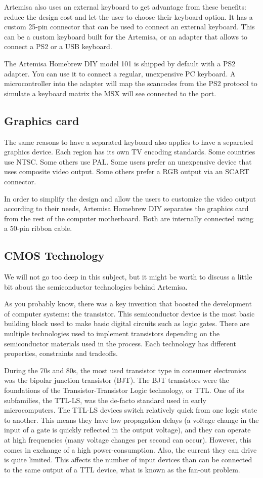 Artemisa also uses an external keyboard to get advantage from these benefits: reduce the design cost and let the user to choose their keyboard option. It has a custom 25-pin connector that can be used to connect an external keyboard. This can be a custom keyboard built for the Artemisa, or an adapter that allows to connect a PS2 or a USB keyboard.

The Artemisa Homebrew DIY model 101 is shipped by default with a PS2 adapter. You can use it to connect a regular, unexpensive PC keyboard. A microcontroller into the adapter will map the scancodes from the PS2 protocol to simulate a keyboard matrix the MSX will see connected to the port.

\subsection{Graphics card}

The same reasons to have a separated keyboard also applies to have a separated graphics device. Each region has its own TV encoding standards. Some countries use NTSC. Some others use PAL. Some users prefer an unexpensive device that uses composite video output. Some others prefer a RGB output via an SCART connector.

In order to simplify the design and allow the users to customize the video output according to their needs, Artemisa Homebrew DIY separates the graphics card from the rest of the computer motherboard. Both are internally connected using a 50-pin ribbon cable.

\subsection{CMOS Technology}

We will not go too deep in this subject, but it might be worth to discuss a little bit about the semiconductor technologies behind Artemisa.

As you probably know, there was a key invention that boosted the development of computer systems: the transistor. This semiconductor device is the most basic building block used to make basic digital circuits such as logic gates. There are multiple technologies used to implement transistors depending on the semiconductor materials used in the process. Each technology has different properties, constraints and tradeoffs.

During the 70s and 80s, the most used transistor type in consumer electronics was the bipolar junction transistor (BJT). The BJT transistors were the foundations of the Transistor-Transistor Logic technology, or TTL. One of its subfamilies, the TTL-LS, was the de-facto standard used in early microcomputers. The TTL-LS devices switch relatively quick from one logic state to another. This means they have low propagation delays (a voltage change in the input of a gate is quickly reflected in the output voltage), and they can operate at high frequencies (many voltage changes per second can occur). However, this comes in exchange of a high power-consumption. Also, the current they can drive is quite limited. This affects the number of input devices than can be connected to the same output of a TTL device, what is known as the fan-out problem.

